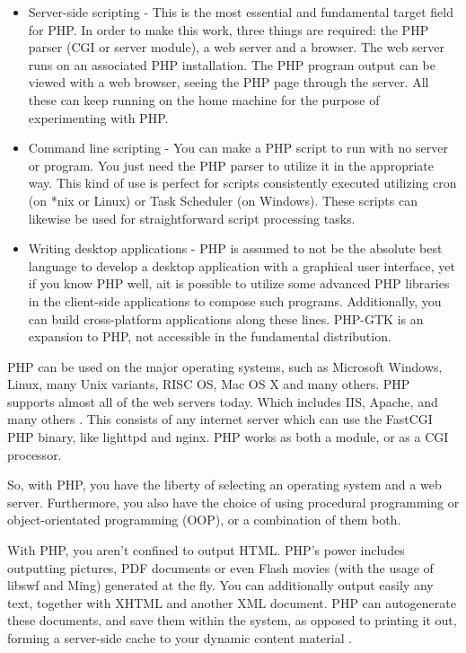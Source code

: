 \documentclass[../thesis.tex]{subfiles}
\begin{document}
\begin{itemize}
\item Server-side scripting -  This is the most essential and fundamental target field for PHP. In order to make this work, three things are required: the PHP parser (CGI or server module), a web server and a browser. The web server runs on an associated PHP installation. The PHP program output can be viewed with a web browser, seeing the PHP page through the server. All these can keep running on the home machine for the purpose of experimenting with PHP.
  
\item Command line scripting - You can make a PHP script to run with no server or program. You just need the PHP parser to utilize it in the appropriate way. This kind of use is perfect for scripts consistently executed utilizing cron (on *nix or Linux) or Task Scheduler (on Windows). These scripts can likewise be used for straightforward script processing tasks.
   
\item Writing desktop applications - PHP is assumed to not be the absolute best language to develop a desktop application with a graphical user interface, yet if you know PHP well, ait is possible to utilize some advanced PHP libraries in the client-side applications to compose such programs. Additionally, you can build cross-platform applications along these lines. PHP-GTK is an expansion to PHP, not accessible in the fundamental distribution.
\end{itemize}
    
PHP can be used on the major operating systems, such as Microsoft Windows, Linux, many Unix variants, RISC OS, Mac OS X and many others. PHP supports almost all of the web servers today. Which includes IIS, Apache, and many others \cite{php}. This consists of any internet server which can use the FastCGI PHP binary, like lighttpd and nginx. PHP works as both a module, or as a CGI processor.
\newline
    
So, with PHP, you have the liberty of selecting an operating system and a web server. Furthermore, you also have the choice of using procedural programming or object-orientated programming (OOP), or a combination of them both.
\newline
    
With PHP, you aren't confined to output HTML. PHP's power includes outputting pictures, PDF documents or even Flash movies (with the usage of libswf and Ming) generated at the fly. You can additionally output easily any text, together with XHTML and another XML document. PHP can autogenerate these documents, and save them within the system, as opposed to printing it out, forming a server-side cache to your dynamic content material \cite{php}.
\newline
    
\end{document}
